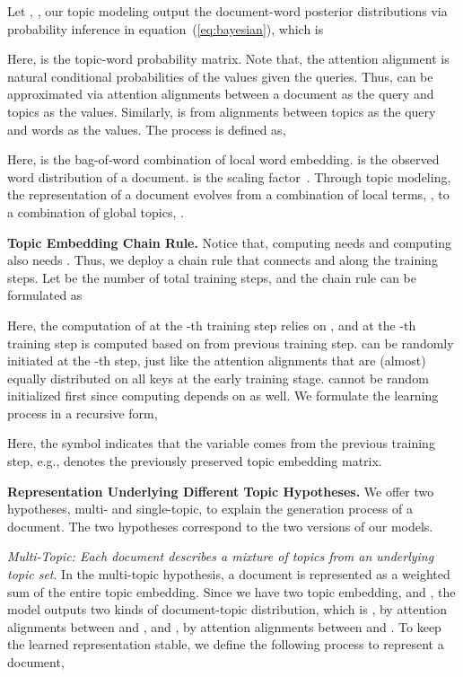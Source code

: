 \documentclass{ecai}
\begin{document}
Let , , our topic modeling output the document-word posterior distributions via probability inference in equation~(\ref{eq:bayesian}), which is

Here,  is the topic-word probability matrix. Note that, the attention alignment is natural conditional probabilities of the values given the queries. Thus,  can be approximated via attention alignments between a document as the query and topics as the values. Similarly,  is from alignments between topics as the query and words as the values. The process is defined as,

Here,  is the bag-of-word combination of local word embedding.  is the observed word distribution of a document.  is the scaling factor~\cite{vaswani2017attention}. Through topic modeling, the representation of a document evolves from a combination of local terms, , to a combination of global topics, .\hfill \break


\noindent\textbf{Topic Embedding Chain Rule.} Notice that, computing  needs  and computing  also needs . Thus, we deploy a chain rule that connects  and  along the training steps. Let  be the number of total training steps, and the chain rule can be formulated as

Here, the computation of  at the -th training step relies on , and  at the -th training step is computed based on  from previous training step.  can be randomly initiated at the -th step, just like the attention alignments that are (almost) equally distributed on all keys at the early training stage.  cannot be random initialized first since computing  depends on  as well. We formulate the learning process in a recursive form, 

Here, the symbol  indicates that the variable comes from the previous training step, e.g.,  denotes the previously preserved topic embedding matrix.\hfill \break

\noindent\textbf{Representation Underlying Different Topic Hypotheses.} We offer two hypotheses, multi- and single-topic, to explain the generation process of a document. The two hypotheses correspond to the two versions of our models.

\textit{Multi-Topic: \label{hyp:first}Each document describes a mixture of topics from an underlying topic set}. In the multi-topic hypothesis, a document is represented as a weighted sum of the entire topic embedding. Since we have two topic embedding,  and , the model outputs two kinds of document-topic distribution, which is , by attention alignments between  and , and , by attention alignments between  and . To keep the learned representation stable, we define the following process to represent a document, 
\end{document}
